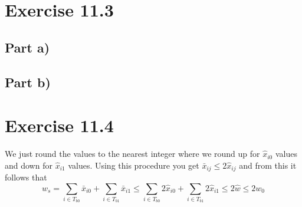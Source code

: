 \documentclass[10pt,a4paper]{article}
\begin{document}
\section*{Exercise 11.3}

\subsection*{Part a)}

\subsection*{Part b)}

\section*{Exercise 11.4}

We just round the values to the nearest integer where we round up for $\hat{x}_{i0}$ values and down for $\hat{x}_{i1}$ values.
Using this procedure you get $\bar{x}_{ij} \le 2\hat{x}_{ij}$ and from this it follows that
\begin{equation*}
  w_{s} = \sum_{i \in T_{b0}} \bar{x}_{i0} + \sum_{i \in T_{b1}} \bar{x}_{i1} \le \sum_{i \in T_{b0}} 2\hat{x}_{i0} + \sum_{i \in T_{b1}} 2\hat{x}_{i1} \le 2\hat{w} \le 2w_{0}
\end{equation*}
\end{document}
